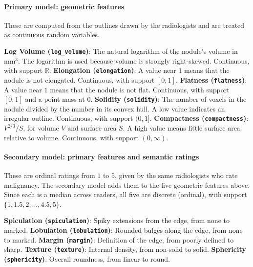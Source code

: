\documentclass[12pt]{article}
\begin{document}
\paragraph{Primary model: geometric features}
These are computed from the outlines drawn by the radiologists and
are treated as continuous random variables.
\begin{itemize}
    \ii \textbf{Log Volume (\texttt{log\_volume})}:
    The natural logarithm of the nodule's volume in mm$^3$.
    The logarithm is used because volume is strongly right-skewed.
    Continuous, with support $\mathbb{R}$.
    \ii \textbf{Elongation (\texttt{elongation})}:
    A value near $1$ means that the nodule is not elongated.
    Continuous, with support $[0, 1]$.
    \ii \textbf{Flatness (\texttt{flatness})}:
    A value near $1$ means that the nodule is not flat.
    Continuous, with support $[0, 1]$ and a point mass at $0$.
    \ii \textbf{Solidity (\texttt{solidity})}:
    The number of voxels in the nodule divided by the number in its
    convex hull. A low value indicates an irregular outline.
    Continuous, with support $(0, 1]$.
    \ii \textbf{Compactness (\texttt{compactness})}:
    $V^{2/3}/S$, for volume $V$ and surface area $S$.
    A high value means little surface area relative to volume.
    Continuous, with support $(0, \infty)$.
\end{itemize}

\paragraph{Secondary model: primary features and semantic ratings}
These are ordinal ratings from $1$ to $5$, given by the same
radiologists who rate malignancy.
The secondary model adds them to the five
geometric features above. Since each is a median across readers, all
five are discrete (ordinal), with support
$\{1, 1.5, 2, \dots, 4.5, 5\}$.
\begin{itemize}
    \ii \textbf{Spiculation (\texttt{spiculation})}:
    Spiky extensions from the edge, from none to marked.
    \ii \textbf{Lobulation (\texttt{lobulation})}:
    Rounded bulges along the edge, from none to marked.
    \ii \textbf{Margin (\texttt{margin})}:
    Definition of the edge, from poorly defined to sharp.
    \ii \textbf{Texture (\texttt{texture})}:
    Internal density, from non-solid to solid.
    \ii \textbf{Sphericity (\texttt{sphericity})}:
    Overall roundness, from linear to round.
\end{itemize}
\end{document}

